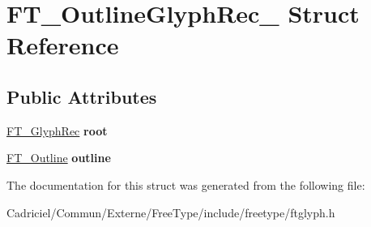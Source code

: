 \hypertarget{struct_f_t___outline_glyph_rec__}{\section{F\-T\-\_\-\-Outline\-Glyph\-Rec\-\_\- Struct Reference}
\label{struct_f_t___outline_glyph_rec__}
}
\subsection*{Public Attributes}
\begin{DoxyCompactItemize}
\item 
\hypertarget{struct_f_t___outline_glyph_rec___a71e5a8d5fe69e0cea68c96486dd6713f}{\hyperlink{struct_f_t___glyph_rec__}{F\-T\-\_\-\-Glyph\-Rec} {\bfseries root}}\label{struct_f_t___outline_glyph_rec___a71e5a8d5fe69e0cea68c96486dd6713f}

\item 
\hypertarget{struct_f_t___outline_glyph_rec___af1bd473a32fcbc500edcfcf89e3ac8ac}{\hyperlink{struct_f_t___outline__}{F\-T\-\_\-\-Outline} {\bfseries outline}}\label{struct_f_t___outline_glyph_rec___af1bd473a32fcbc500edcfcf89e3ac8ac}

\end{DoxyCompactItemize}


The documentation for this struct was generated from the following file\-:\begin{DoxyCompactItemize}
\item 
Cadriciel/\-Commun/\-Externe/\-Free\-Type/include/freetype/ftglyph.\-h\end{DoxyCompactItemize}
